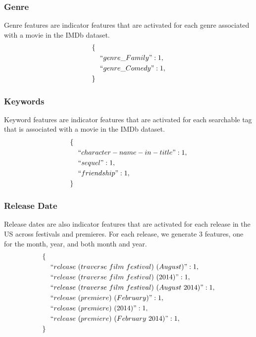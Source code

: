 \documentclass[journal]{IEEEtran}
\begin{document}
\subsubsection{Genre}
Genre features are indicator features that are activated for each
genre associated with a movie in the IMDb dataset.
\begin{align*}
        \{\ \ &\\
        &``genre\_Family": 1,\\
        &``genre\_Comedy": 1,\\
        \}\ \ &
\end{align*}

\subsubsection{Keywords}
Keyword features are indicator features that are activated for
each searchable tag that is associated with a movie in the
IMDb dataset.
\begin{align*}
        \{\ \ &\\
        &``character-name-in-title": 1,\\
        &``sequel": 1,\\
        &``friendship": 1,\\
        \}\ \ &
\end{align*}

\subsubsection{Release Date}
Release dates are also indicator features that are activated for each release
in the US across festivals and premieres. For each release, we generate 3
features, one for the month, year, and both month and year.
\begin{align*}
        \{\ \ &\\
        &``release\ (traverse\ film\ festival)\ (August)": 1, \\
        &``release\ (traverse\ film\ festival)\ (2014)": 1, \\
        &``release\ (traverse\ film\ festival)\ (August\ 2014)": 1, \\
        &``release\ (premiere)\ (February)": 1, \\
        &``release\ (premiere)\ (2014)": 1, \\
        &``release\ (premiere)\ (February\ 2014)": 1, \\
        \}\ \ &
\end{align*}
\end{document}
